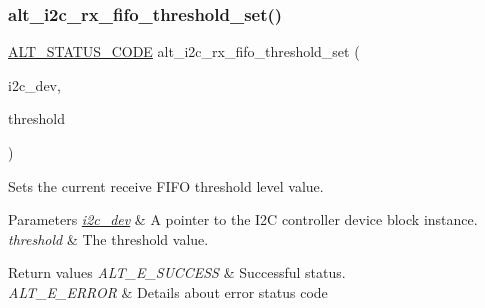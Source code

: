 \subsubsection{\texorpdfstring{alt\_i2c\_rx\_fifo\_threshold\_set()}{alt\_i2c\_rx\_fifo\_threshold\_set()}}
{\footnotesize\ttfamily \mbox{\hyperlink{hwlib_8h_abdb0d369f069723ca55d6c94bcaaaa12}{A\+L\+T\+\_\+\+S\+T\+A\+T\+U\+S\+\_\+\+C\+O\+DE}} alt\+\_\+i2c\+\_\+rx\+\_\+fifo\+\_\+threshold\+\_\+set (\begin{DoxyParamCaption}\item[{\mbox{\hyperlink{structALT__I2C__DEV__s}{A\+L\+T\+\_\+\+I2\+C\+\_\+\+D\+E\+V\+\_\+t}} $\ast$}]{i2c\+\_\+dev,  }\item[{const uint8\+\_\+t}]{threshold }\end{DoxyParamCaption})}

Sets the current receive F\+I\+FO threshold level value.


\begin{DoxyParams}{Parameters}
{\em \mbox{\hyperlink{structi2c__dev}{i2c\+\_\+dev}}} & A pointer to the I2C controller device block instance.\\
\hline
{\em threshold} & The threshold value.\\
\hline
\end{DoxyParams}

\begin{DoxyRetVals}{Return values}
{\em A\+L\+T\+\_\+\+E\+\_\+\+S\+U\+C\+C\+E\+SS} & Successful status. \\
\hline
{\em A\+L\+T\+\_\+\+E\+\_\+\+E\+R\+R\+OR} & Details about error status code \\
\hline
\end{DoxyRetVals}
